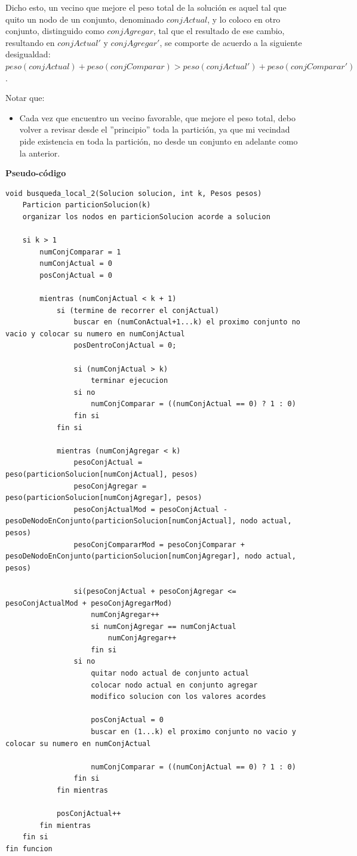 Dicho esto, un vecino que mejore el peso total de la solución es aquel tal que quito un nodo de un conjunto, denominado $conjActual$, y lo coloco en otro conjunto, distinguido como $conjAgregar$, tal que el resultado de ese cambio, resultando en $conjActual'$ y $conjAgregar'$, se comporte de acuerdo a la siguiente desigualdad: $peso(conjActual) + peso(conjComparar) > peso(conjActual') + peso(conjComparar')$.

Notar que:

\begin{itemize}
\item Cada vez que encuentro un vecino favorable, que mejore el peso total, debo volver a revisar desde el ''principio'' toda la partición, ya que mi vecindad pide existencia en toda la partición, no desde un conjunto en adelante como la anterior.
\end{itemize}

\textbf{Pseudo-código}

\begin{lstlisting}
void busqueda_local_2(Solucion solucion, int k, Pesos pesos)
	Particion particionSolucion(k)
	organizar los nodos en particionSolucion acorde a solucion

	si k > 1
		numConjComparar = 1
		numConjActual = 0
		posConjActual = 0

		mientras (numConjActual < k + 1)
			si (termine de recorrer el conjActual)
				buscar en (numConActual+1...k) el proximo conjunto no vacio y colocar su numero en numConjActual
				posDentroConjActual = 0;

				si (numConjActual > k)
					terminar ejecucion
				si no
					numConjComparar = ((numConjActual == 0) ? 1 : 0)
				fin si
			fin si

			mientras (numConjAgregar < k)
				pesoConjActual = peso(particionSolucion[numConjActual], pesos)
				pesoConjAgregar = peso(particionSolucion[numConjAgregar], pesos)
				pesoConjActualMod = pesoConjActual - pesoDeNodoEnConjunto(particionSolucion[numConjActual], nodo actual, pesos)
				pesoConjCompararMod = pesoConjComparar + pesoDeNodoEnConjunto(particionSolucion[numConjAgregar], nodo actual, pesos)

				si(pesoConjActual + pesoConjAgregar <= pesoConjActualMod + pesoConjAgregarMod)
					numConjAgregar++
					si numConjAgregar == numConjActual
						numConjAgregar++
					fin si
				si no
					quitar nodo actual de conjunto actual
					colocar nodo actual en conjunto agregar
					modifico solucion con los valores acordes

					posConjActual = 0
					buscar en (1...k) el proximo conjunto no vacio y colocar su numero en numConjActual

					numConjComparar = ((numConjActual == 0) ? 1 : 0)
				fin si
			fin mientras

			posConjActual++
		fin mientras
	fin si
fin funcion
\end{lstlisting}
\newpage

